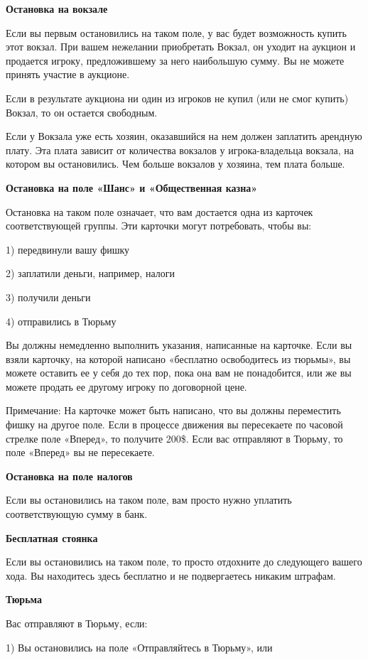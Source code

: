 {\bf Остановка на вокзале}

Если вы первым остановились на таком поле, у вас будет возможность купить этот вокзал. При вашем нежелании приобретать Вокзал, он уходит на аукцион и продается игроку, предложившему за него наибольшую сумму. Вы не можете принять участие в аукционе.

Если в результате аукциона ни один из игроков не купил (или не смог купить) Вокзал, то он остается свободным.

Если у Вокзала уже есть хозяин, оказавшийся на нем должен заплатить арендную плату. Эта плата зависит от количества вокзалов у игрока-владельца вокзала, на котором вы остановились. Чем больше вокзалов у хозяина, тем плата больше.

{\bf Остановка на поле «Шанс» и «Общественная казна»}

Остановка на таком поле означает, что вам достается одна из карточек соответствующей группы. Эти карточки могут потребовать, чтобы вы:

1) передвинули вашу фишку

2) заплатили деньги, например, налоги

3) получили деньги

4) отправились в Тюрьму

Вы должны немедленно выполнить указания, написанные на карточке. Если вы взяли карточку, на которой написано «бесплатно освободитесь из тюрьмы», вы можете оставить ее у себя до тех пор, пока она вам не понадобится, или же вы можете продать ее другому игроку по договорной цене.

Примечание: На карточке может быть написано, что вы должны переместить фишку на другое поле. Если в процессе движения вы пересекаете по часовой стрелке поле «Вперед», то получите 200\$. Если вас отправляют в Тюрьму, то поле «Вперед» вы не пересекаете.

{\bf Остановка на поле налогов}

Если вы остановились на таком поле, вам просто нужно уплатить соответствующую сумму в банк.

{\bf Бесплатная стоянка}

Если вы остановились на таком поле, то просто отдохните до следующего вашего хода. Вы находитесь здесь бесплатно и не подвергаетесь никаким штрафам.

{\bf Тюрьма}

Вас отправляют в Тюрьму, если:

1) Вы остановились на поле «Отправляйтесь в Тюрьму», или

